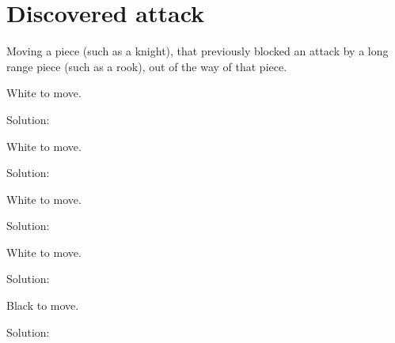 \documentclass{book}
\begin{document}
\section{Discovered attack}
Moving a piece (such as a knight), that previously blocked an attack by a long range piece (such as a rook), out of the way of that piece.\begin{multicols}{2} 
\begin{samepage} 
\newgame 


 
\showboard
 
 White to move. 
 
Solution: 
 
\end{samepage}\begin{samepage} 
\newgame 


 
\showboard
 
 White to move. 
 
Solution: 
 
\end{samepage}\begin{samepage} 
\newgame 


 
\showboard
 
 White to move. 
 
Solution: 
 
\end{samepage}\begin{samepage} 
\newgame 


 
\showboard
 
 White to move. 
 
Solution: 
 
\end{samepage}\begin{samepage} 
\newgame 


 
\showboard
 
 Black to move. 
 
Solution: 
 
\end{samepage}\end{multicols} 
\newpage 
\end{document}

